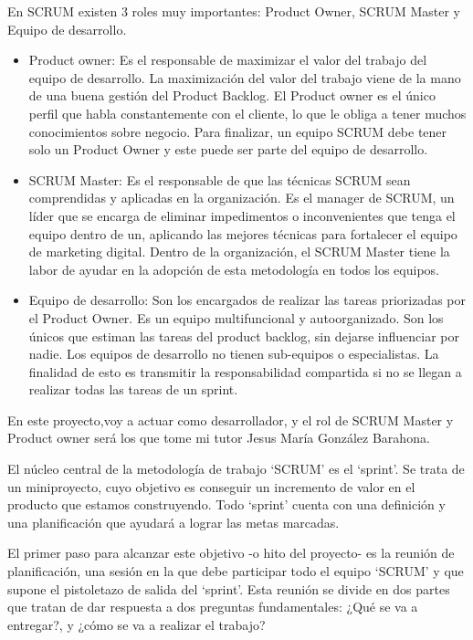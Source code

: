 \documentclass[a4paper, 12pt]{book}
\begin{document}
En SCRUM existen 3 roles muy importantes: Product Owner, SCRUM Master y Equipo de desarrollo.
\begin{itemize}
\newpage
    \item Product owner:
    Es el responsable de maximizar el valor del trabajo del equipo de desarrollo. La maximización del valor del trabajo viene de la mano de una buena gestión del Product Backlog.
    El Product owner es el único perfil que habla constantemente con el cliente, lo que le obliga a tener muchos conocimientos sobre negocio.
    Para finalizar, un equipo SCRUM debe tener solo un Product Owner y este puede ser parte del equipo de desarrollo.
    
    \item SCRUM Master:
    Es el responsable de que las técnicas SCRUM sean comprendidas y aplicadas en la organización. Es el manager de SCRUM, un líder que se encarga de eliminar impedimentos o inconvenientes que tenga el equipo dentro de un, aplicando las mejores técnicas para fortalecer el equipo de marketing digital.
    Dentro de la organización, el SCRUM Master tiene la labor de ayudar en la adopción de esta metodología en todos los equipos.
    
    \item Equipo de desarrollo:
    Son los encargados de realizar las tareas priorizadas por el Product Owner. Es un equipo multifuncional y autoorganizado. Son los únicos que estiman las tareas del product backlog, sin dejarse influenciar por nadie.
    Los equipos de desarrollo no tienen sub-equipos o especialistas. La finalidad de esto es transmitir la responsabilidad compartida si no se llegan a realizar todas las tareas de un sprint.
    
\end{itemize}

En este proyecto,voy a actuar como desarrollador, y el rol de SCRUM Master y Product owner será los que tome mi tutor Jesus María González Barahona.

El núcleo central de la metodología de trabajo ‘SCRUM’ es el ‘sprint’. Se trata de un miniproyecto, cuyo objetivo es conseguir un incremento de valor en el producto que estamos construyendo. Todo ‘sprint’ cuenta con una definición y una planificación que ayudará a lograr las metas marcadas.

El primer paso para alcanzar este objetivo -o hito del proyecto- es la reunión de planificación, una sesión en la que debe participar todo el equipo ‘SCRUM’ y que supone el pistoletazo de salida del ‘sprint’. Esta reunión se divide en dos partes que tratan de dar respuesta a dos preguntas fundamentales: ¿Qué se va a entregar?, y ¿cómo se va a realizar el trabajo?
\end{document}
